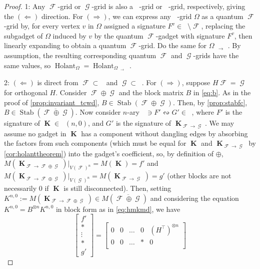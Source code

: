 \documentclass{article}
\theoremstyle{remark}
\theoremstyle{definition}
\DeclareMathOperator{\vk}{\mathbf{K}}
\DeclareMathOperator{\fc}{\mathcal{F}}
\DeclareMathOperator{\gc}{\mathcal{G}}
\DeclareMathOperator{\qk}{\mathfrak{Q}_{\mathcal{F}}}
\DeclareMathOperator{\ofc}{\overline{\fc}}
\DeclareMathOperator{\ogc}{\overline{\gc}}
\DeclareMathOperator{\stab}{Stab}
\DeclareMathOperator{\holant}{Holant}
\begin{document}
\begin{proof}
    1: Any $\fc$-grid or $\gc$-grid is also a $\ofc$-grid or $\ogc$-grid, respectively, giving
    the $(\Longleftarrow)$ direction. For $(\Longrightarrow)$, we can express any $\ofc$-grid $\Omega$
    as a quantum $\fc$-grid by, for every vertex $v$ in $\Omega$ assigned a signature $F^v \in
    \ofc \setminus \fc$, replacing the subgadget of $\Omega$ induced by $v$ by the quantum
    $\fc$-gadget with signature $F^v$, then linearly expanding to obtain a quantum $\fc$-grid.
    Do the same for $\Omega_{\ofc\to\ogc}$. 
    By assumption, the resulting corresponding quantum $\fc$ 
    and $\gc$-grids have the same values, so $\holant_\Omega = \holant_{\Omega_{\ofc\to\ogc}}$.

    2: $(\Longleftarrow)$ is direct from $\fc \subset \ofc$ and $\gc \subset \ogc$. For $(\Longrightarrow)$, suppose
    $H\fc = \gc$ for orthogonal $H$. Consider $\fc \oplus \gc$ and the block matrix 
    $B$ in \eqref{eq:b}. As in the proof of \autoref{prop:invariant_tcwd},
    $B \in \stab(\fc \oplus \gc)$. Then, by \autoref{prop:stabfc}, $B \in 
    \stab(\overline{\fc \oplus \gc})$. Now consider $n$-ary 
    $\ofc \ni F' \leftrightsquigarrow G' \in \ogc$,
    where $F'$ is the signature of $\vk \in \qk(n,0)$, and $G'$ is the signature of $\vk_{\fc\to\gc}$.
    We may assume no gadget in $\vk$ has a component without dangling edges
    by absorbing the factors from such components (which must be equal for
    $\vk$ and $\vk_{\fc\to\gc}$ by \autoref{cor:holanttheorem}) into the gadget's coefficient,
    so, by definition of $\oplus$, $M(\vk_{\fc\to\fc\oplus\gc})|_{V(\fc)^n} = M(\vk) = f'$ and
    $M(\vk_{\fc\to\fc\oplus\gc})|_{V(\gc)^n} = M(\vk_{\fc\to\gc}) = g'$ (other blocks are not necessarily
    0 if $\vk$ is still disconnected). Then, setting
    $K^{n,0} := M(\vk_{\fc\to\fc\oplus\gc}) \in M(\overline{\fc \oplus \gc})$ and considering 
    the equation $K^{n,0} = B^{\otimes n}K^{n,0}$ in block form as in \eqref{eq:hmkmd}, we have
    \[
        \begin{bmatrix} 
            f' \\ * \\ \vdots \\ * \\ g'
        \end{bmatrix} =
        \begin{bmatrix} 
            0 & 0 & \ldots & 0 &(H^\top)^{\otimes n}\\
            0 & 0 & \ldots & * & 0\\

\end{bmatrix}\]
\end{proof}
\end{document}
